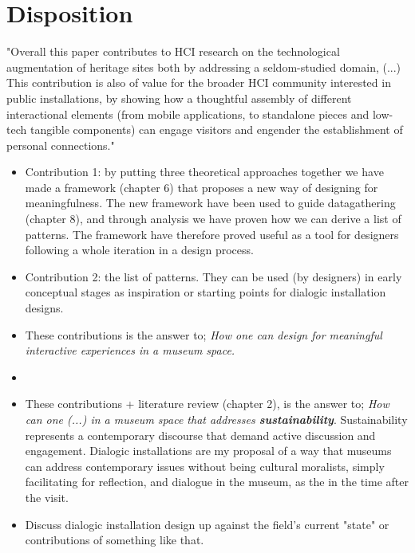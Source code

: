 \section{Disposition}

"Overall this paper contributes to HCI research on the technological augmentation of heritage sites both by addressing a seldom-studied domain, (...) This contribution is also of value for the broader HCI community interested in public installations, by showing how a thoughtful assembly of different interactional elements (from mobile applications, to standalone pieces and low-tech tangible components) can engage visitors and engender the establishment of personal connections." \autocite{ciolfi_designing_2012}


\begin{itemize}
    \item Contribution 1: by putting three theoretical approaches together we have made a framework (chapter 6) that proposes a new way of designing for meaningfulness. The new framework have been used to guide datagathering (chapter 8), and through analysis we have proven how we can derive a list of patterns. The framework have therefore proved useful as a tool for designers following a whole iteration in a design process.
    
    
    \item Contribution 2: the list of patterns. They can be used (by designers) in early conceptual stages as inspiration or starting points for dialogic installation designs. 
    \item These contributions is the answer to; \emph{How one can design for meaningful interactive experiences in a museum space.}
    \item
    
     \item These contributions + literature review (chapter 2), is the answer to; \emph{How can one (...) in a museum space that addresses \textbf{sustainability}}. Sustainability represents a contemporary discourse that demand active discussion and engagement. Dialogic installations are my proposal of a way that museums can address contemporary issues without being cultural moralists, simply facilitating for reflection, and dialogue in the museum, as the  in the time after the visit. 
    \item Discuss dialogic installation design up against the field's current "state" or contributions of something like that.

\end{itemize}


